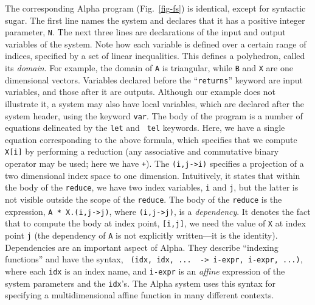   The corresponding Alpha program (Fig.~\ref{fig-fs}) is identical, except for
syntactic sugar.  The first line names the system and declares that it has a
positive integer parameter, {\tt N}.  The next three lines are declarations of
the input and output variables of the system.  Note how each variable is
defined over a certain range of indices, specified by a set of linear
inequalities.  This defines a polyhedron, called its {\em domain}.  For
example, the domain of {\tt A} is triangular, while {\tt B} and {\tt X} are
one dimensional vectors.  Variables declared before the ``{\tt returns}''
keyword are input variables, and those after it are outputs.  Although our
example does not illustrate it, a system may also have local variables, which
are declared after the system header, using the keyword {\tt var}.  The body
of the program is a number of equations delineated by the {\tt let} and {\tt
tel} keywords.  Here, we have a single equation corresponding to the above
formula, which specifies that we compute {\tt X[i]} by performing a reduction
(any associative and commutative binary operator may be used; here we have
{\tt +}).  The {\tt (i,j->i)} specifies a projection of a two dimensional
index space to one dimension.  Intuitively, it states that within the body of
the {\tt reduce}, we have two index variables, {\tt i} and {\tt j}, but the
latter is not visible outside the scope of the {\tt reduce}.  The body of the
{\tt reduce} is the expression, {\tt A * X.(i,j->j)}, where {\tt (i,j->j)}, is
a {\em dependency}. It denotes the fact that to compute the body at index
point, {\tt [i,j]}, we need the value of {\tt X} at index point {\tt j} (the
dependency of {\tt A} is not explicitly written---it is the identity).
Dependencies are an important aspect of Alpha.  They describe ``indexing
functions'' and have the syntax,
 \verb! (idx, idx, ...  -> i-expr, i-expr, ...)!, where each {\tt idx} is an
index name, and {\tt i-expr} is an {\em affine} expression of the system
parameters and the {\tt idx}'s.  The Alpha system uses this syntax for
specifying a multidimensional affine function in many different contexts.

